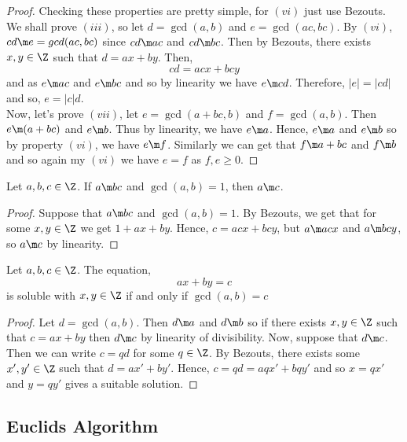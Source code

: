 \begin{proof}
  Checking these properties are pretty simple, for $(vi)$ just use Bezouts. \\

  We shall prove $(iii)$, so let $d = \gcd(a, b)$ and $e = \gcd(ac, bc)$. By $(vi)$, $cd \m e = gcd(ac, bc)$ since $cd \m ac$ and $cd \m bc$. Then by Bezouts, there exists $x, y \in \Z$ such that $d = ax + by$. Then,
  $$ cd = acx + bcy $$
  and as $e \m ac$ and $e \m bc$ and so by linearity we have $e \m cd$. Therefore, $|e| = |cd|$ and so, $e = |c|d$.\\

  Now, let's prove $(vii)$, let $e = \gcd(a + bc, b)$ and $f = \gcd(a, b)$. Then $e \m (a + bc)$ and $e \m b$. Thus by linearity, we have $e \m a$. Hence, $e \m a$ and $e \m b$ so by property $(vi)$, we have $e \m f$. Similarly we can get that $f \m a + bc$ and $f \m b$ and so again my $(vi)$ we have $e = f$ as $f, e \ge 0$.
\end{proof}

\begin{nlemma}
  Let $a, b, c \in \Z$. If $a \m bc$ and $\gcd(a, b) = 1$, then $a \m c$.
\end{nlemma}

\begin{proof}
  Suppose that $a \m bc$ and $\gcd(a, b) = 1$. By Bezouts, we get that for some $x, y \in \Z$ we get $1 + ax + by$. Hence, $c = acx + bcy$, but $a \m acx$ and $a \m bcy$, so $a \m c$ by linearity.
\end{proof}

\begin{nthm}
  Let $a, b, c \in \Z$. The equation,
  $$ ax + by = c $$
  is soluble with $x, y \in \Z$ if and only if $\gcd(a, b) = c$
\end{nthm}

\begin{proof}
  Let $d = \gcd(a, b)$. Then $d \m a$ and $d \m b$ so if there exists $x, y \in \Z$ such that $c = ax + by$ then $d \m c$ by linearity of divisibility. Now, suppose that $d \m c$. Then we can write $c = qd$ for some $q \in \Z$. By Bezouts, there exists some $x', y' \in \Z$ such that $d = ax' + by'$. Hence, $c = qd = aqx' + bqy'$ and so $x = qx'$ and $y = qy'$ gives a suitable solution.
\end{proof}

\subsection{Euclids Algorithm}


